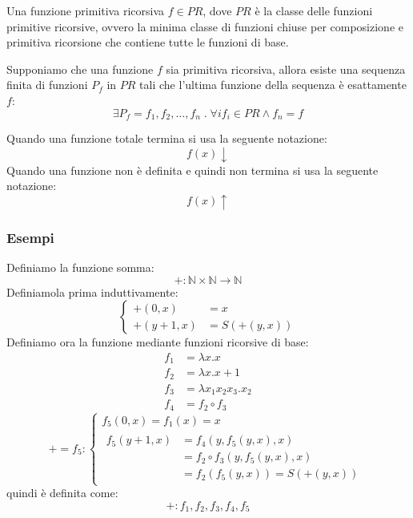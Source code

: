 \documentclass[a4paper]{article}
\begin{document}
\begin{definition}
  Una funzione primitiva ricorsiva \( f \in PR \), dove \( PR \) è la classe delle funzioni primitive
  ricorsive, ovvero la minima classe di funzioni chiuse per composizione e primitiva
  ricorsione che contiene tutte le funzioni di base.
\end{definition}

\begin{definition}
  Supponiamo che una funzione \( f \) sia primitiva ricorsiva, allora esiste una
  sequenza finita di funzioni \(P_f\) in \( PR \) tali che
  l'ultima funzione della sequenza è esattamente \( f \):
  \[
    \exists P_f = f_1, f_2, \ldots, f_n \;.\; \forall i f_i \in PR \wedge f_n = f
  \] 
\end{definition}

\begin{define}
  Quando una funzione totale termina si usa la seguente notazione:
  \[
    f(x) \downarrow
  \] 
  Quando una funzione non è definita e quindi non termina si usa la seguente notazione:
  \[
    f(x) \uparrow
  \] 
\end{define}


\subsubsection{Esempi}
\begin{example}[Somma]
  Definiamo la funzione somma:
  \[
    +: \mathbb{N} \times \mathbb{N} \to \mathbb{N}
  \] 
  Definiamola prima induttivamente:
  \[
    \begin{cases}
      +(0, x) &= x \\
      +(y+1, x) &= S(+(y, x))
    \end{cases}
  \] 
  Definiamo ora la funzione mediante funzioni ricorsive di base:
  \[
    \begin{aligned}
      f_1 &= \lambda x.x \\
      f_2 &= \lambda x. x+1 \\
      f_3 &= \lambda x_1 x_2 x_3. x_2 \\
      f_4 &= f_2 \circ f_3
    \end{aligned}
  \] 
  \[
    + = f_5:
    \begin{cases}
      f_5(0,x) = f_1(x) = x \\
      \begin{aligned}
        f_5(y+1,x) &= f_4(y, f_5(y,x), x) \\
                   &= f_2 \circ f_3 (y, f_5(y,x), x) \\
                   &= f_2(f_5(y,x)) = S(+(y,x))
      \end{aligned}
    \end{cases}
  \] 
  quindi è definita come:
  \[
    +: f_1, f_2, f_3, f_4, f_5
  \] 
\end{example}
\end{document}
